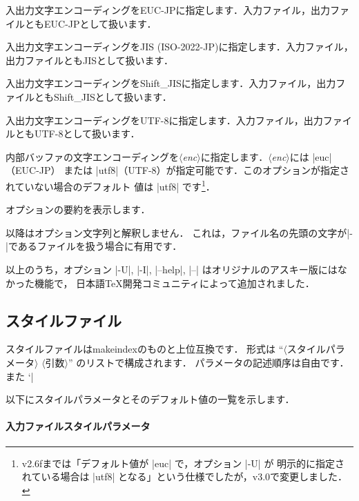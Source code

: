 \documentclass[a4paper]{jsarticle}
\newcommand{\SoftName}[1]{\textsf{#1}}
\newcommand{\Meta}[1]{$\langle$\mbox{}\textit{#1}\mbox{}$\rangle$}
\newcommand{\jMeta}[1]{$\langle$\mbox{}\textsf{#1}\mbox{}$\rangle$}
\begin{document}
\begin{description}[leftmargin=2cm]
\item[|-E|]
入出力文字エンコーディングをEUC-JPに指定します．入力ファイル，出力ファイルともEUC-JPとして扱います．

\item[|-J|]
入出力文字エンコーディングをJIS (ISO-2022-JP)に指定します．入力ファイル，出力ファイルともJISとして扱います．

\item[|-S|]
入出力文字エンコーディングをShift\_JISに指定します．入力ファイル，出力ファイルともShift\_JISとして扱います．

\item[|-U|]
入出力文字エンコーディングをUTF-8に指定します．入力ファイル，出力ファイルともUTF-8として扱います．

\item[|-I| \Meta{enc}]
内部バッファの文字エンコーディングを\Meta{enc}に指定します．\Meta{enc}には |euc|（EUC-JP）
または |utf8|（UTF-8）が指定可能です．このオプションが指定されていない場合のデフォルト
値は |utf8| です\footnote{v2.6fまでは「デフォルト値が |euc| で，オプション |-U| が
明示的に指定されている場合は |utf8| となる」という仕様でしたが，v3.0で変更しました．}．

\item[|--help|]
オプションの要約を表示します．

\item[|--|]
以降はオプション文字列と解釈しません．
これは，ファイル名の先頭の文字が|-|であるファイルを扱う場合に有用です．
\end{description}

以上のうち，オプション |-U|, |-I|, |--help|, |--| はオリジナルのアスキー版にはなかった機能で，
日本語\TeX 開発コミュニティによって追加されました．

\subsection{スタイルファイル}

スタイルファイルは\SoftName{makeindex}のものと上位互換です．
形式は ``\jMeta{スタイルパラメータ} \jMeta{引数}'' のリストで構成されます．
パラメータの記述順序は自由です．また `|%

以下にスタイルパラメータとそのデフォルト値の一覧を示します．

\paragraph{入力ファイルスタイルパラメータ}
\end{document}
